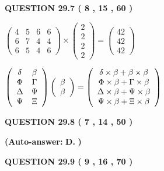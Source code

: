 \documentclass[12pt]{article}
\begin{document}
{\textbf{\large{QUESTION
29.7 
 (           8 ,          15 ,          60 )
}}}

 
$\left( \begin{array}{ccccccccccccccc}
           4  & 
           5  & 
           6  & 
           6  \\ 
           6  & 
           7  & 
           4  & 
           4  \\ 
           6  & 
           5  & 
           4  & 
           6
\end{array}\right) \times
\left( \begin{array}{c}
           2  \\ 
           2  \\ 
           2  \\ 
           2
\end{array}\right)  =
\left( \begin{array}{c}
          42  \\ 
          42  \\ 
          42
\end{array}\right)  $
 
$  %
 \left( \begin{array}
 {
 c
 c
 }
 \delta & 
 \beta \\ 
 \Phi & 
 \Gamma \\ 
 \Delta & 
 \Psi \\ 
 \Psi & 
                    \Xi
 \end{array} \right)
 \left( \begin{array}
 {
 c
 }
 \beta \\ 
 \beta
 \end{array} \right)
=
 \left( \begin{array}
 {
 c
 }
  \delta \times  \beta +  \beta \times  \beta \\ 
  \Phi \times  \beta +  \Gamma \times  \beta \\ 
  \Delta \times  \beta +  \Psi \times  \beta \\ 
  \Psi \times  \beta +                     \Xi \times  \beta
 \end{array} \right)
$
 
  
  
{\textbf{\large{QUESTION
29.8 
 (           7 ,          14 ,          50 )
}}}
 
 
{\textbf{(Auto-answer:}}
{\textbf{\large{
D.}}}
{\textbf{)}}
 
 
  
  
{\textbf{\large{QUESTION
29.9 
 (           9 ,          16 ,          70 )
}}}
\end{document}
